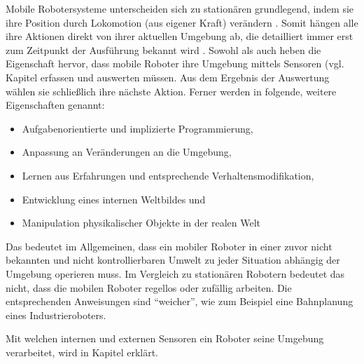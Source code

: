 Mobile Robotersysteme unterscheiden sich zu stationären grundlegend, indem sie ihre Position durch Lokomotion (aus eigener Kraft) verändern \cite{Haun2007}. Somit hängen alle ihre Aktionen direkt von ihrer aktuellen Umgebung ab, die detailliert immer erst zum Zeitpunkt der Ausführung bekannt wird \cite{hertzberg2009mobile}. Sowohl \cite{hertzberg2009mobile} als auch \cite{Haun2007} heben die Eigenschaft hervor, dass mobile Roboter ihre Umgebung mittels Sensoren (vgl. Kapitel  erfassen und auswerten müssen. Aus dem Ergebnis der Auswertung wählen sie schließlich ihre nächste Aktion. Ferner werden in \cite{Haun2007} folgende, weitere Eigenschaften genannt:
\begin{itemize}
\item Aufgabenorientierte und implizierte Programmierung,
\item Anpassung an Veränderungen an die Umgebung,
\item Lernen aus Erfahrungen und entsprechende Verhaltensmodifikation,
\item Entwicklung eines internen Weltbildes und
\item Manipulation physikalischer Objekte in der realen Welt
\end{itemize}
Das bedeutet im Allgemeinen, dass ein mobiler Roboter in einer zuvor nicht bekannten und nicht kontrollierbaren Umwelt zu jeder Situation abhängig der Umgebung operieren muss. Im Vergleich zu stationären Robotern bedeutet das nicht, dass die mobilen Roboter regellos oder zufällig arbeiten. Die entsprechenden Anweisungen sind "`weicher"', wie zum Beispiel eine Bahnplanung eines Industrieroboters.

Mit welchen internen und externen Sensoren ein Roboter seine Umgebung verarbeitet, wird in Kapitel  erklärt.


